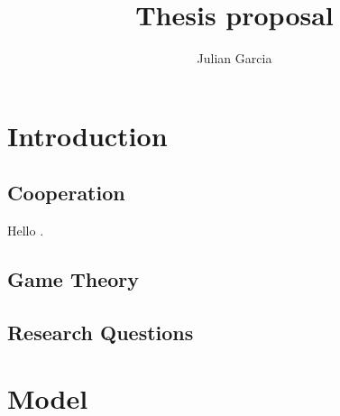 \documentclass[11pt]{report}
\title{Thesis proposal}
\author{Julian Garcia}
\begin{document}
\maketitle

\chapter{Introduction}

\section{Cooperation}

Hello \cite{garcia:JTB:2012}.

\section{Game Theory}

\section{Research Questions}

\chapter{Model}



\end{document}
